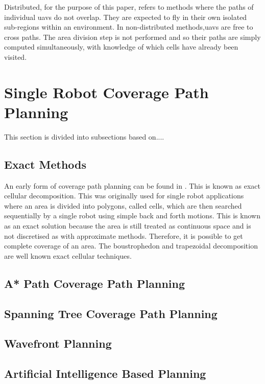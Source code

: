 Distributed, for the purpose of this paper, refers to methods where the paths of individual \acsp{uav} do not overlap. They are expected to fly in their own isolated sub-regions within an environment. In non-distributed methods,\acsp{uav} are free to cross paths. The area division step is not performed and so their paths are simply computed simultaneously, with knowledge of which cells have already been visited. \cite{Juan2018}

\section{Single Robot Coverage Path Planning}
\label{sec:lit SR CPP}
This section is divided into subsections based on....
\subsection{Exact Methods}
\label{sec:lit SR CPP - Exact}
An early form of coverage path planning can be found in \cite{Choset2001}. This is known as exact cellular decomposition. This was originally used for single robot applications where an area is divided into polygons, called cells, which are then searched sequentially by a single robot using simple back and forth motions. This is known as an exact solution because the area is still treated as continuous space and is not discretised as with approximate methods. Therefore, it is possible to get complete coverage of an area. The boustrophedon and trapezoidal decomposition are well known exact cellular techniques.\\
\subsection{A* Path Coverage Path Planning}
\subsection{Spanning Tree Coverage Path Planning}
\label{sec:lit SR CPP - STC}

\subsection{Wavefront Planning}
\subsection{Artificial Intelligence Based Planning}
